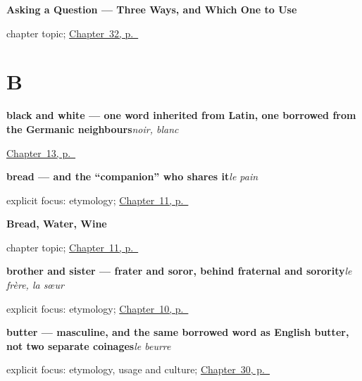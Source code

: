 \noindent\begin{minipage}[t]{\linewidth}
\raggedright
\textbf{Asking a Question — Three Ways, and Which One to Use}\par
\footnotesize chapter topic; \hyperref[ch:fr-questions]{Chapter~32, p.~\pageref*{ch:fr-questions}}
\end{minipage}\par\smallskip

\section*{B}

\noindent\begin{minipage}[t]{\linewidth}
\raggedright
\textbf{black and white — one word inherited from Latin, one borrowed from the Germanic neighbours}\enspace\emph{noir, blanc}\par
\footnotesize \hyperref[ch:colours]{Chapter~13, p.~\pageref*{ch:colours}}
\end{minipage}\par\smallskip

\noindent\begin{minipage}[t]{\linewidth}
\raggedright
\textbf{bread — and the \textquotedblleft{}companion\textquotedblright{} who shares it}\enspace\emph{le pain}\par
\footnotesize explicit focus: etymology; \hyperref[ch:food]{Chapter~11, p.~\pageref*{ch:food}}
\end{minipage}\par\smallskip

\noindent\begin{minipage}[t]{\linewidth}
\raggedright
\textbf{Bread, Water, Wine}\par
\footnotesize chapter topic; \hyperref[ch:food]{Chapter~11, p.~\pageref*{ch:food}}
\end{minipage}\par\smallskip

\noindent\begin{minipage}[t]{\linewidth}
\raggedright
\textbf{brother and sister — frater and soror, behind fraternal and sorority}\enspace\emph{le frère, la sœur}\par
\footnotesize explicit focus: etymology; \hyperref[ch:family]{Chapter~10, p.~\pageref*{ch:family}}
\end{minipage}\par\smallskip

\noindent\begin{minipage}[t]{\linewidth}
\raggedright
\textbf{butter — masculine, and the same borrowed word as English butter, not two separate coinages}\enspace\emph{le beurre}\par
\footnotesize explicit focus: etymology, usage and culture; \hyperref[ch:fr-cheese-butter-salt-egg]{Chapter~30, p.~\pageref*{ch:fr-cheese-butter-salt-egg}}
\end{minipage}\par\smallskip

